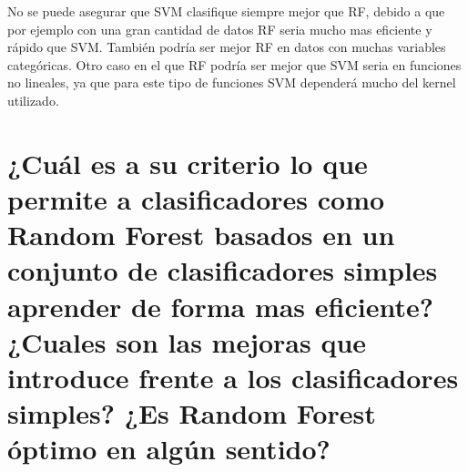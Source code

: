 \documentclass[titlepage]{article}
\begin{document}
No se puede asegurar que SVM clasifique siempre mejor que RF, debido a que por ejemplo con una gran cantidad de datos RF seria mucho mas eficiente y rápido que SVM. También podría ser mejor RF en datos con muchas variables categóricas. Otro caso en el que RF podría ser mejor que SVM seria en funciones no lineales, ya que para este tipo de funciones SVM dependerá mucho del kernel utilizado.

\section{¿Cuál es a su criterio lo que permite a clasificadores como Random Forest basados en un conjunto de clasificadores simples aprender de forma mas eficiente? ¿Cuales son las mejoras que introduce frente a los clasificadores simples? ¿Es Random Forest óptimo en algún sentido?}
\end{document}
